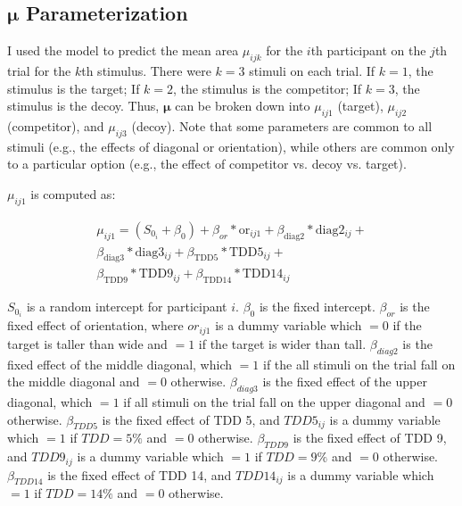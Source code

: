 \subsection{\texorpdfstring{$\boldsymbol{\mu}$}{mu} Parameterization}

I used the model to predict the mean area $\mu_{ijk}$ for the $i$th participant on the $j$th trial for the $k$th stimulus. There were $k=3$ stimuli on each trial. If $k=1$, the stimulus is the target; If $k=2$, the stimulus is the competitor; If $k=3$, the stimulus is the decoy. Thus, $\boldsymbol{\mu}$ can be broken down into $\mu_{ij1}$ (target), $\mu_{ij2}$ (competitor), and $\mu_{ij3}$ (decoy). Note that some parameters are common to all stimuli (e.g., the effects of diagonal or orientation), while others are common only to a particular option (e.g., the effect of competitor vs. decoy vs. target). 

$\mu_{ij1}$ is computed as:

\begin{equation}
    \begin{aligned}
        \mu_{ij1}=(S_{0_i} + \beta_{0}) + \beta_{or}*\mathrm{or}_{ij1} + \beta_{\mathrm{diag}2}*\mathrm{diag}2_{ij}+ \\
        \beta_{\mathrm{diag}3}*\mathrm{diag}3_{ij} + \beta_{\mathrm{TDD}5}*\mathrm{TDD}5_{ij} +\\ \beta_{\mathrm{TDD}9}*\mathrm{TDD}9_{ij} + \beta_{\mathrm{TDD}14}*\mathrm{TDD}14_{ij}
        \label{circle_mu_eqn1}
    \end{aligned}
\end{equation}

$S_{0_i}$ is a random intercept for participant $i$. $\beta_{0}$ is the fixed intercept. $\beta_{or}$ is the fixed effect of orientation, where $or_{ij1}$ is a dummy variable which $=0$ if the target is taller than wide and $=1$ if the target is wider than tall. $\beta_{diag2}$ is the fixed effect of the middle diagonal, which $=1$ if the all stimuli on the trial fall on the middle diagonal and $=0$ otherwise. $\beta_{diag3}$ is the fixed effect of the upper diagonal, which $=1$ if all stimuli on the trial fall on the upper diagonal and $=0$ otherwise. $\beta_{TDD5}$ is the fixed effect of TDD 5, and $TDD5_{ij}$ is a dummy variable which $=1$ if $TDD=5\%$ and $=0$ otherwise. $\beta_{TDD9}$ is the fixed effect of TDD 9, and $TDD9_{ij}$ is a dummy variable which $=1$ if $TDD=9\%$ and $=0$ otherwise. $\beta_{TDD14}$ is the fixed effect of TDD 14, and $TDD14_{ij}$ is a dummy variable which $=1$ if $TDD=14\%$ and $=0$ otherwise. 

